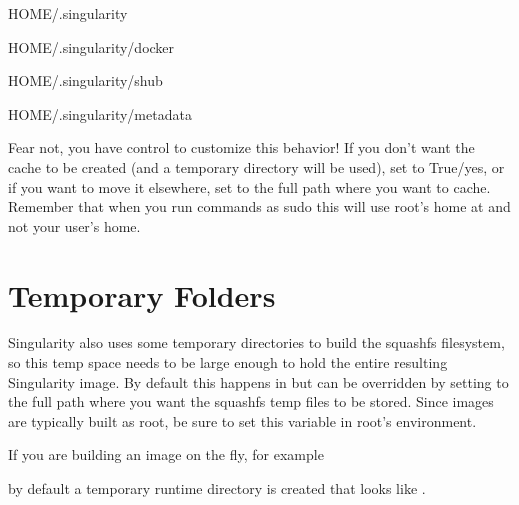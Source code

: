 \documentclass[letterpaper,10pt,english]{sphinxmanual}
\begin{document}
%
\begin{sphinxVerbatim}[commandchars=\\\{\}]
\PYGZdl{}HOME/.singularity

\PYGZdl{}HOME/.singularity/docker

\PYGZdl{}HOME/.singularity/shub

\PYGZdl{}HOME/.singularity/metadata
\end{sphinxVerbatim}

Fear not, you have control to customize this behavior! If you don’t want
the cache to be created (and a temporary directory will be used), set  to
True/yes, or if you want to move it elsewhere, set  to the full path
where you want to cache. Remember that when you run commands as sudo
this will use root’s home at  and not your user’s home.


\section{Temporary Folders}
\label{\detokenize{build_environment:temporary-folders}}\begin{quote}
\label{\detokenize{build_environment:sec-temporaryfolders}}\end{quote}

Singularity also uses some temporary directories to build the squashfs filesystem,
so this temp space needs to be large enough to hold the entire resulting Singularity image.
By default this happens in  but can be overridden by setting  to the full
path where you want the squashfs temp files to be stored. Since images
are typically built as root, be sure to set this variable in root’s
environment.

If you are building an image on the fly, for example

%
\begin{sphinxVerbatim}[commandchars=\\\{\}]
   
\end{sphinxVerbatim}

by default a temporary runtime directory is created that looks like .
\end{document}
